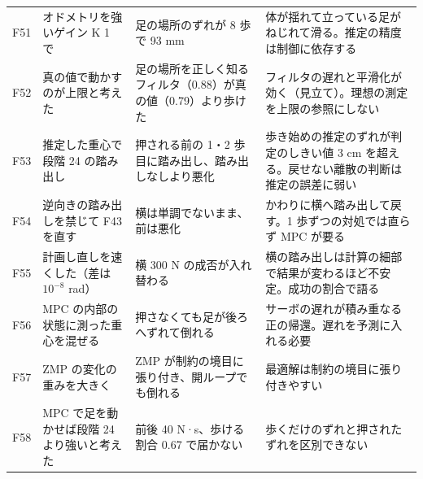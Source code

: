 \documentclass[paper=a4paper,fontsize=10pt,twocolumn,column_gap=2zw,line_length=24zw,number_of_lines=46,head_space=20mm]{jlreq}
\begin{document}
\begin{table}[t]
\begin{tabular}{cp{}p{}p{}}
F51 & オドメトリを強いゲイン K 1 で & 足の場所のずれが 8 歩で 93 mm & 体が揺れて立っている足がねじれて滑る。推定の精度は制御に依存する \\
F52 & 真の値で動かすのが上限と考えた & 足の場所を正しく知るフィルタ（0.88）が真の値（0.79）より歩けた & フィルタの遅れと平滑化が効く（見立て）。理想の測定を上限の参照にしない \\
F53 & 推定した重心で段階 24 の踏み出し & 押される前の 1・2 歩目に踏み出し、踏み出しなしより悪化 & 歩き始めの推定のずれが判定のしきい値 3 cm を超える。戻せない離散の判断は推定の誤差に弱い \\
F54 & 逆向きの踏み出しを禁じて F43 を直す & 横は単調でないまま、前は悪化 & かわりに横へ踏み出して戻す。1 歩ずつの対処では直らず MPC が要る \\
F55 & 計画し直しを速くした（差は $10^{-8}$ rad） & 横 300 N の成否が入れ替わる & 横の踏み出しは計算の細部で結果が変わるほど不安定。成功の割合で語る \\
F56 & MPC の内部の状態に測った重心を混ぜる & 押さなくても足が後ろへずれて倒れる & サーボの遅れが積み重なる正の帰還。遅れを予測に入れる必要 \\
F57 & ZMP の変化の重みを大きく & ZMP が制約の境目に張り付き、開ループでも倒れる & 最適解は制約の境目に張り付きやすい \\
F58 & MPC で足を動かせば段階 24 より強いと考えた & 前後 40 N·s、歩ける割合 0.67 で届かない & 歩くだけのずれと押されたずれを区別できない \\\bottomrule
\end{tabular}
\end{table}
\end{document}
